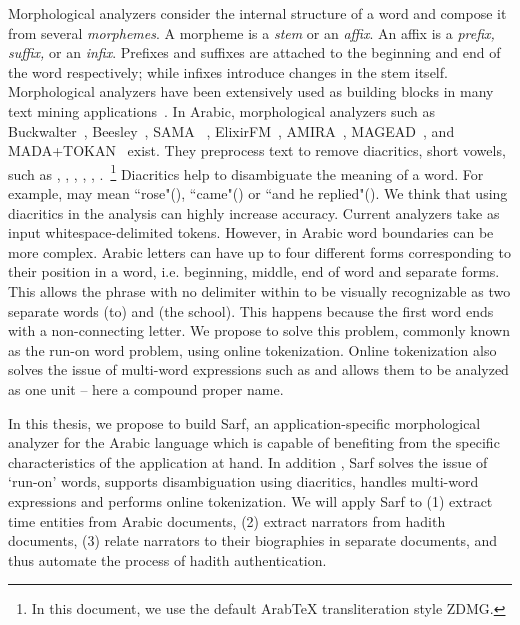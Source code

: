 \documentclass[a4,12pt]{report}
\newcommand{\noTrRL}[1]{\transfalse\RL{#1}\transtrue}
\newcommand{\noTrnoVocRL}[1]{\transfalse\novocalize\noTrRL{#1}\vocalize\transtrue}
\newcommand{\noVocRL}[1]{\transtrue\novocalize\RL{#1}\vocalize}
\begin{document}
Morphological analyzers %
consider the internal structure of a word and compose it from
several {\em morphemes}. 
A morpheme is a {\em stem} or an {\em affix}.
An affix is a {\em prefix, suffix,} or an {\em infix}.
Prefixes and suffixes are attached to the beginning and end of the word respectively; 
while infixes introduce changes in the stem itself. 
Morphological analyzers have been extensively used as building blocks 
in many text mining applications~\cite{Sou07}.  In Arabic, morphological analyzers such as  
Buckwalter~\cite{Buckwalter:02},
Beesley~\cite{Beesley:01},
SAMA ~\cite{Kulick:10},
ElixirFM~\cite{Otakar:07}, 
AMIRA~\cite{Diab:07,Benajiba:07},
MAGEAD~\cite{Habash:05}, 
and MADA+TOKAN~\cite{Habash:09}
exist.
They preprocess text to remove diacritics, short vowels, such as 
, , , , , .~\footnote{In this document, 
we use the default ArabTeX transliteration style ZDMG.} Diacritics help to disambiguate the
meaning of a word. For example, \noVocRL{wrd} may mean ``rose"(), ``came"(\fullvocalize{}) 
or ``and he replied"(). We think that using diacritics in the analysis can highly increase accuracy.
Current analyzers take as input whitespace-delimited tokens. However, in Arabic word boundaries can be more complex.
Arabic letters can have up to 
four different forms
corresponding to their position in a word, i.e. beginning,
middle, end of word and separate forms. 
This allows the phrase
\noTrnoVocRL{il_A\nospace almdrsT}  with no delimiter within
to be visually recognizable
as two separate words \noVocRL{il_A} (to) and \noVocRL{almdrsT} (the school).
This happens because the first word \noVocRL{il_A} ends with
\noVocRL{_A} a non-connecting letter. We propose to solve this problem, commonly known as the run-on word problem, using online tokenization.
Online tokenization also solves the issue of multi-word expressions such as \noVocRL{`abid al-la.tiyf} and 
allows them to be analyzed as one unit -- here a compound proper name.


In this thesis, we propose to build Sarf, an application-specific 
morphological analyzer for the Arabic language 
which is capable of benefiting
from the specific characteristics of the application at hand.
In addition , Sarf solves the issue of `run-on' words, supports disambiguation using diacritics, 
handles multi-word expressions and performs online tokenization. 
We will apply Sarf to  
(1) extract time entities from Arabic documents,
(2) extract narrators from hadith documents,
(3) relate narrators to their biographies in separate documents, and 
 thus automate the process of hadith authentication.
\end{document}
